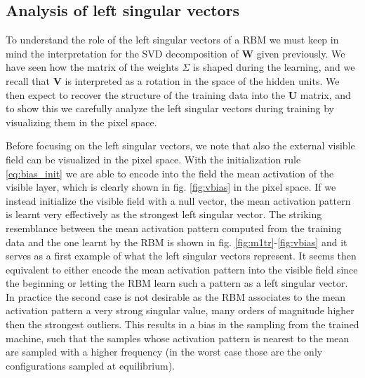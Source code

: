 \documentclass{revtex4-1}
\begin{document}
\subsection{Analysis of left singular vectors}

To understand the role of the left singular vectors of a RBM we must keep in mind the interpretation for the SVD decomposition of \textbf{W} given previously. We have seen how the matrix of the weights \textbf{\(\Sigma\)} is shaped during the learning, and we recall that \textbf{V} is interpreted as a rotation in the space of the hidden units. We then expect to recover the structure of the training data into the \textbf{U} matrix, and to show this we carefully analyze the left singular vectors during training by visualizing them in the pixel space.

Before focusing on the left singular vectors, we note that also the external visible field can be visualized in the pixel space. With the initialization rule \eqref{eq:bias_init} we are able to encode into the field the mean activation of the visible layer, which is clearly shown in fig. \ref{fig:vbias} in the pixel space. If we instead initialize the visible field with a null vector, the mean activation pattern is learnt very effectively as the strongest left singular vector. The striking resemblance between the mean activation pattern computed from the training data and the one learnt by the RBM is shown in fig. \ref{fig:m1tr}-\ref{fig:vbias} and it serves as a first example of what the left singular vectors represent. It seems then equivalent to either encode the mean activation pattern into the visible field since the beginning or letting the RBM learn such a pattern as a left singular vector. In practice the second case is not desirable as the RBM associates to the mean activation pattern a very strong singular value, many orders of magnitude higher then the strongest outliers. This results in a bias in the sampling from the trained machine, such that the samples whose activation pattern is nearest to the mean are sampled with a higher frequency (in the worst case those are the only configurations sampled at equilibrium).
\end{document}
